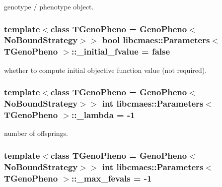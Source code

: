 genotype / phenotype object. \hypertarget{classlibcmaes_1_1Parameters_a421b56efbe82da078cbe32a6c59ea80f}{
\subsubsection[{\+\_\+initial\+\_\+fvalue}]{\setlength{\rightskip}{0pt plus 5cm}template$<$class T\+Geno\+Pheno = Geno\+Pheno$<$\+No\+Bound\+Strategy$>$$>$ bool {\bf libcmaes\+::\+Parameters}$<$ T\+Geno\+Pheno $>$\+::\+\_\+initial\+\_\+fvalue = false\hspace{0.3cm}{\ttfamily [protected]}}}\label{classlibcmaes_1_1Parameters_a421b56efbe82da078cbe32a6c59ea80f}
whether to compute initial objective function value (not required). \hypertarget{classlibcmaes_1_1Parameters_af732f7206f23cbd6ec2bbd4e217a9a2b}{
\subsubsection[{\+\_\+lambda}]{\setlength{\rightskip}{0pt plus 5cm}template$<$class T\+Geno\+Pheno = Geno\+Pheno$<$\+No\+Bound\+Strategy$>$$>$ int {\bf libcmaes\+::\+Parameters}$<$ T\+Geno\+Pheno $>$\+::\+\_\+lambda = -\/1\hspace{0.3cm}{\ttfamily [protected]}}}\label{classlibcmaes_1_1Parameters_af732f7206f23cbd6ec2bbd4e217a9a2b}
number of offsprings. \hypertarget{classlibcmaes_1_1Parameters_ad316488121bd51f62b28e8183d591c9e}{
\subsubsection[{\+\_\+max\+\_\+fevals}]{\setlength{\rightskip}{0pt plus 5cm}template$<$class T\+Geno\+Pheno = Geno\+Pheno$<$\+No\+Bound\+Strategy$>$$>$ int {\bf libcmaes\+::\+Parameters}$<$ T\+Geno\+Pheno $>$\+::\+\_\+max\+\_\+fevals = -\/1\hspace{0.3cm}{\ttfamily [protected]}}}\label{classlibcmaes_1_1Parameters_ad316488121bd51f62b28e8183d591c9e}
